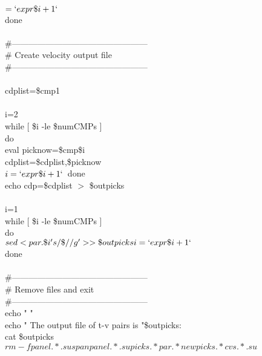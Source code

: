   $=`expr \$i + 1`$\\
done \\
 \\
\#------------------------------------------------ \\
\# Create velocity output file \\
\#------------------------------------------------ \\
 \\
cdplist=\$cmp1 \\
 \\
i=2 \\
while [ \$i -le \$numCMPs ] \\
do \\
    eval picknow=\$cmp\$i \\
    cdplist=\$cdplist,\$picknow \\
   $i=`expr \$i + 1` $\
done \\
echo cdp=\$cdplist   $>$ \$outpicks \\
 \\
i=1 \\
while [ \$i -le \$numCMPs ] \\
do \\
  $sed < par.\$i 's/\$/ \\/g' > > \$outpicks \\
  i=`expr \$i + 1` $ \\
done \\
 \\
\#------------------------------------------------ \\
\# Remove files and exit \\
\#------------------------------------------------ \\
echo " " \\
echo " The output file of t-v pairs is "\$outpicks: \\
cat \$outpicks \\
$rm -f panel.*.su spanpanel.*.su picks.* par.* newpicks.* cvs.*.su $\\